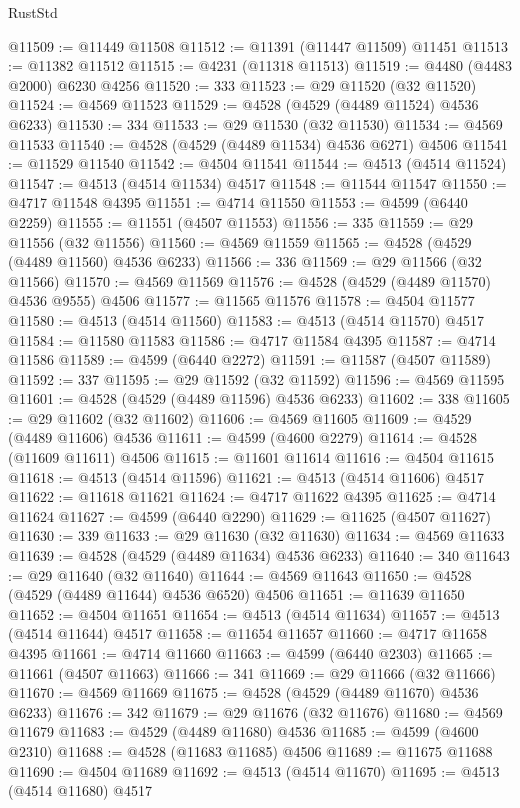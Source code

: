 \begin{lexlean}{RustStd}
\begin{coremodule}
@11509 := @11449 @11508
@11512 := @11391 (@11447 @11509) @11451
@11513 := @11382 @11512
@11515 := @4231 (@11318 @11513)
@11519 := @4480 (@4483 @2000) @6230 @4256
@11520 := 333
@11523 := @29 @11520 (@32 @11520)
@11524 := @4569 @11523
@11529 := @4528 (@4529 (@4489 @11524) @4536 @6233)
@11530 := 334
@11533 := @29 @11530 (@32 @11530)
@11534 := @4569 @11533
@11540 := @4528 (@4529 (@4489 @11534) @4536 @6271) @4506
@11541 := @11529 @11540
@11542 := @4504 @11541
@11544 := @4513 (@4514 @11524)
@11547 := @4513 (@4514 @11534) @4517
@11548 := @11544 @11547
@11550 := @4717 @11548 @4395
@11551 := @4714 @11550
@11553 := @4599 (@6440 @2259)
@11555 := @11551 (@4507 @11553)
@11556 := 335
@11559 := @29 @11556 (@32 @11556)
@11560 := @4569 @11559
@11565 := @4528 (@4529 (@4489 @11560) @4536 @6233)
@11566 := 336
@11569 := @29 @11566 (@32 @11566)
@11570 := @4569 @11569
@11576 := @4528 (@4529 (@4489 @11570) @4536 @9555) @4506
@11577 := @11565 @11576
@11578 := @4504 @11577
@11580 := @4513 (@4514 @11560)
@11583 := @4513 (@4514 @11570) @4517
@11584 := @11580 @11583
@11586 := @4717 @11584 @4395
@11587 := @4714 @11586
@11589 := @4599 (@6440 @2272)
@11591 := @11587 (@4507 @11589)
@11592 := 337
@11595 := @29 @11592 (@32 @11592)
@11596 := @4569 @11595
@11601 := @4528 (@4529 (@4489 @11596) @4536 @6233)
@11602 := 338
@11605 := @29 @11602 (@32 @11602)
@11606 := @4569 @11605
@11609 := @4529 (@4489 @11606) @4536
@11611 := @4599 (@4600 @2279)
@11614 := @4528 (@11609 @11611) @4506
@11615 := @11601 @11614
@11616 := @4504 @11615
@11618 := @4513 (@4514 @11596)
@11621 := @4513 (@4514 @11606) @4517
@11622 := @11618 @11621
@11624 := @4717 @11622 @4395
@11625 := @4714 @11624
@11627 := @4599 (@6440 @2290)
@11629 := @11625 (@4507 @11627)
@11630 := 339
@11633 := @29 @11630 (@32 @11630)
@11634 := @4569 @11633
@11639 := @4528 (@4529 (@4489 @11634) @4536 @6233)
@11640 := 340
@11643 := @29 @11640 (@32 @11640)
@11644 := @4569 @11643
@11650 := @4528 (@4529 (@4489 @11644) @4536 @6520) @4506
@11651 := @11639 @11650
@11652 := @4504 @11651
@11654 := @4513 (@4514 @11634)
@11657 := @4513 (@4514 @11644) @4517
@11658 := @11654 @11657
@11660 := @4717 @11658 @4395
@11661 := @4714 @11660
@11663 := @4599 (@6440 @2303)
@11665 := @11661 (@4507 @11663)
@11666 := 341
@11669 := @29 @11666 (@32 @11666)
@11670 := @4569 @11669
@11675 := @4528 (@4529 (@4489 @11670) @4536 @6233)
@11676 := 342
@11679 := @29 @11676 (@32 @11676)
@11680 := @4569 @11679
@11683 := @4529 (@4489 @11680) @4536
@11685 := @4599 (@4600 @2310)
@11688 := @4528 (@11683 @11685) @4506
@11689 := @11675 @11688
@11690 := @4504 @11689
@11692 := @4513 (@4514 @11670)
@11695 := @4513 (@4514 @11680) @4517

\end{coremodule}
\end{lexlean}
